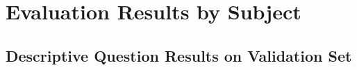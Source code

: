 \newpage
\section{Evaluation Results by Subject}
\label{sec:eval_by_subject}
\subsection{Descriptive Question Results on Validation Set}
\vspace{-1ex}
\begin{table}[h]
  \centering
  \caption{Results by subject on descriptive questions. \textbf{Bold} number represents best performance in-class (open-source or proprietary). Elec. Eng. \& Sys. Sci. denotes Electrical Engineering and Systems Science.}
\end{table}
